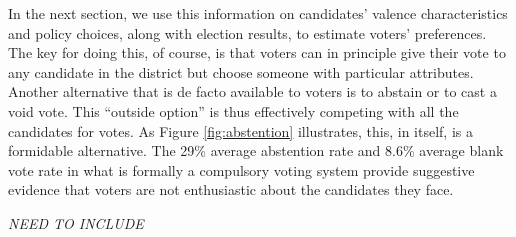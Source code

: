 \documentclass[12pt,english]{article}
\newcommand{\lyxdot}{.}
\numberwithin{equation}{section}
\theoremstyle{plain}
\theoremstyle{remark}
\theoremstyle{plain}
\begin{document}
In the next section, we use this information on candidates' valence characteristics and policy choices, along with election results, to estimate voters' preferences.  The key for doing this, of course, is that voters can in principle give their vote to any candidate in the district but choose someone with particular attributes. Another alternative that is de facto available to voters is to abstain or to cast a void vote. This ``outside option'' is thus effectively competing with all the candidates for votes. As Figure  \ref{fig:abstention} illustrates, this, in itself, is a formidable alternative. The 29\% average abstention rate and 8.6\% average blank vote rate in what is formally a compulsory voting system provide suggestive evidence that voters are not enthusiastic about the candidates they face.

\emph{NEED TO INCLUDE}

{\linespread{1} \small  
}
\end{document}
